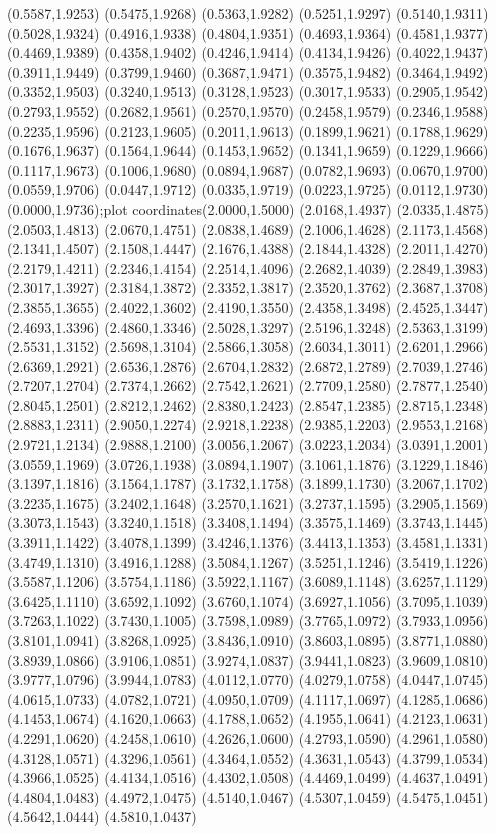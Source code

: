 {(0.5587,1.9253) (0.5475,1.9268) (0.5363,1.9282) (0.5251,1.9297) (0.5140,1.9311) (0.5028,1.9324) (0.4916,1.9338) (0.4804,1.9351) (0.4693,1.9364) (0.4581,1.9377) (0.4469,1.9389) (0.4358,1.9402) (0.4246,1.9414) (0.4134,1.9426) (0.4022,1.9437) (0.3911,1.9449) (0.3799,1.9460) (0.3687,1.9471) (0.3575,1.9482) (0.3464,1.9492) (0.3352,1.9503) (0.3240,1.9513) (0.3128,1.9523) (0.3017,1.9533) (0.2905,1.9542) (0.2793,1.9552) (0.2682,1.9561) (0.2570,1.9570) (0.2458,1.9579) (0.2346,1.9588) (0.2235,1.9596) (0.2123,1.9605) (0.2011,1.9613) (0.1899,1.9621) (0.1788,1.9629) (0.1676,1.9637) (0.1564,1.9644) (0.1453,1.9652) (0.1341,1.9659) (0.1229,1.9666) (0.1117,1.9673) (0.1006,1.9680) (0.0894,1.9687) (0.0782,1.9693) (0.0670,1.9700) (0.0559,1.9706) (0.0447,1.9712) (0.0335,1.9719) (0.0223,1.9725) (0.0112,1.9730) (0.0000,1.9736)};plot coordinates{(2.0000,1.5000) (2.0168,1.4937) (2.0335,1.4875) (2.0503,1.4813) (2.0670,1.4751) (2.0838,1.4689) (2.1006,1.4628) (2.1173,1.4568) (2.1341,1.4507) (2.1508,1.4447) (2.1676,1.4388) (2.1844,1.4328) (2.2011,1.4270) (2.2179,1.4211) (2.2346,1.4154) (2.2514,1.4096) (2.2682,1.4039) (2.2849,1.3983) (2.3017,1.3927) (2.3184,1.3872) (2.3352,1.3817) (2.3520,1.3762) (2.3687,1.3708) (2.3855,1.3655) (2.4022,1.3602) (2.4190,1.3550) (2.4358,1.3498) (2.4525,1.3447) (2.4693,1.3396) (2.4860,1.3346) (2.5028,1.3297) (2.5196,1.3248) (2.5363,1.3199) (2.5531,1.3152) (2.5698,1.3104) (2.5866,1.3058) (2.6034,1.3011) (2.6201,1.2966) (2.6369,1.2921) (2.6536,1.2876) (2.6704,1.2832) (2.6872,1.2789) (2.7039,1.2746) (2.7207,1.2704) (2.7374,1.2662) (2.7542,1.2621) (2.7709,1.2580) (2.7877,1.2540) (2.8045,1.2501) (2.8212,1.2462) (2.8380,1.2423) (2.8547,1.2385) (2.8715,1.2348) (2.8883,1.2311) (2.9050,1.2274) (2.9218,1.2238) (2.9385,1.2203) (2.9553,1.2168) (2.9721,1.2134) (2.9888,1.2100) (3.0056,1.2067) (3.0223,1.2034) (3.0391,1.2001) (3.0559,1.1969) (3.0726,1.1938) (3.0894,1.1907) (3.1061,1.1876) (3.1229,1.1846) (3.1397,1.1816) (3.1564,1.1787) (3.1732,1.1758) (3.1899,1.1730) (3.2067,1.1702) (3.2235,1.1675) (3.2402,1.1648) (3.2570,1.1621) (3.2737,1.1595) (3.2905,1.1569) (3.3073,1.1543) (3.3240,1.1518) (3.3408,1.1494) (3.3575,1.1469) (3.3743,1.1445) (3.3911,1.1422) (3.4078,1.1399) (3.4246,1.1376) (3.4413,1.1353) (3.4581,1.1331) (3.4749,1.1310) (3.4916,1.1288) (3.5084,1.1267) (3.5251,1.1246) (3.5419,1.1226) (3.5587,1.1206) (3.5754,1.1186) (3.5922,1.1167) (3.6089,1.1148) (3.6257,1.1129) (3.6425,1.1110) (3.6592,1.1092) (3.6760,1.1074) (3.6927,1.1056) (3.7095,1.1039) (3.7263,1.1022) (3.7430,1.1005) (3.7598,1.0989) (3.7765,1.0972) (3.7933,1.0956) (3.8101,1.0941) (3.8268,1.0925) (3.8436,1.0910) (3.8603,1.0895) (3.8771,1.0880) (3.8939,1.0866) (3.9106,1.0851) (3.9274,1.0837) (3.9441,1.0823) (3.9609,1.0810) (3.9777,1.0796) (3.9944,1.0783) (4.0112,1.0770) (4.0279,1.0758) (4.0447,1.0745) (4.0615,1.0733) (4.0782,1.0721) (4.0950,1.0709) (4.1117,1.0697) (4.1285,1.0686) (4.1453,1.0674) (4.1620,1.0663) (4.1788,1.0652) (4.1955,1.0641) (4.2123,1.0631) (4.2291,1.0620) (4.2458,1.0610) (4.2626,1.0600) (4.2793,1.0590) (4.2961,1.0580) (4.3128,1.0571) (4.3296,1.0561) (4.3464,1.0552) (4.3631,1.0543) (4.3799,1.0534) (4.3966,1.0525) (4.4134,1.0516) (4.4302,1.0508) (4.4469,1.0499) (4.4637,1.0491) (4.4804,1.0483) (4.4972,1.0475) (4.5140,1.0467) (4.5307,1.0459) (4.5475,1.0451) (4.5642,1.0444) (4.5810,1.0437) }
